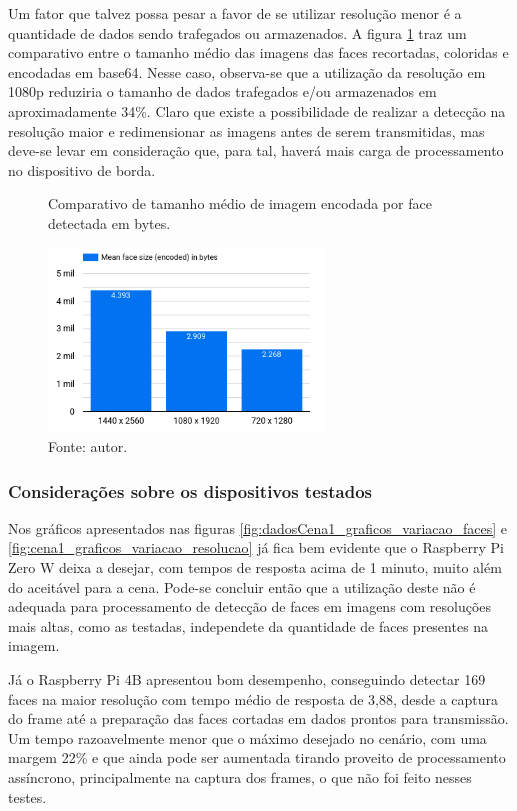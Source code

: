 Um fator que talvez possa pesar a favor de se utilizar resolução menor é a quantidade de dados sendo trafegados ou armazenados. A figura \ref{fig:cena1_comparativo_tamanho_faces} traz um comparativo entre o tamanho médio das imagens das faces recortadas, coloridas e encodadas em base64. Nesse caso, observa-se que a utilização da resolução em 1080p reduziria o tamanho de dados trafegados e/ou armazenados em aproximadamente 34\%. Claro que existe a possibilidade de realizar a detecção na resolução maior e redimensionar as imagens antes de serem transmitidas, mas deve-se levar em consideração que, para tal, haverá mais carga de processamento no dispositivo de borda.

\begin{figure}[h]
    \centering
    \caption[Comparativo de tamanho médio de imagem encodada por face detectada em bytes.]{Comparativo de tamanho médio de imagem encodada por face detectada em bytes.}
    \includegraphics[width=0.65\textwidth]{Cap4_Experimentos_Realizados/Figures/cena1_graficos_tamanho_medio_imagem_face.jpg}
    \caption*{Fonte: autor.}
    \label{fig:cena1_comparativo_tamanho_faces}
\end{figure}

\subsubsection{Considerações sobre os dispositivos testados}
Nos gráficos apresentados nas figuras \ref{fig:dadosCena1_graficos_variacao_faces} e \ref{fig:cena1_graficos_variacao_resolucao} já fica bem evidente que o Raspberry Pi Zero W deixa a desejar, com tempos de resposta acima de 1 minuto, muito além do aceitável para a cena. Pode-se concluir então que a utilização deste não é adequada para processamento de detecção de faces em imagens com resoluções mais altas, como as testadas, independete da quantidade de faces presentes na imagem.

Já o Raspberry Pi 4B apresentou bom desempenho, conseguindo detectar 169 faces na maior resolução com tempo médio de resposta de 3,88, desde a captura do frame até a preparação das faces cortadas em dados prontos para transmissão. Um tempo razoavelmente menor que o máximo desejado no cenário, com uma margem 22\% e que ainda pode ser aumentada tirando proveito de processamento assíncrono, principalmente na captura dos frames, o que não foi feito nesses testes.

